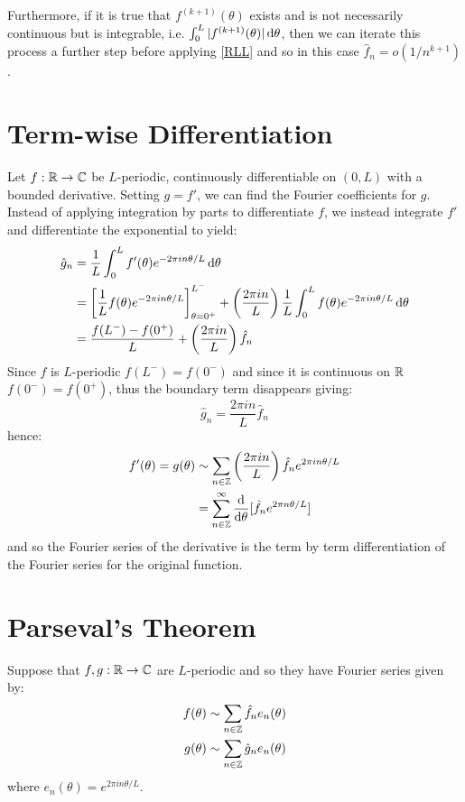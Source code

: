 \documentclass[../main.tex]{subfiles}
\begin{document}
Furthermore, if it is true that $f^{(k + 1)}(\theta)$ exists and is not necessarily continuous but is integrable, i.e. $\int_{0}^{L} |f^{(k + 1)}(\theta)| \d{\theta}$, then we can iterate this process a further step before applying \cref{RLL} and so in this case $\hat{f}_{n} = o(1/n^{k + 1})$.
\section{Term-wise Differentiation}
Let $f: \mathbb{R} \to \mathbb{C}$ be $L$-periodic, continuously differentiable on $(0, L)$ with a bounded derivative.
Setting $g = f'$, we can find the Fourier coefficients for $g$.
Instead of applying integration by parts to differentiate $f$, we instead integrate $f'$ and differentiate the exponential to yield:
\begin{align*}
  \hat{g}_n &= \frac{1}{L} \int_{0}^{L} f'(\theta) e^{-2\pi i n \theta / L} \d{\theta} \\
            &= \eval{\frac{1}{L} f(\theta) e^{-2 \pi i n \theta / L}}{\theta = 0^{+}}{L^{-}} + \left(\frac{2 \pi i n}{L}\right) \frac{1}{L} \int_{0}^{L} f(\theta) e^{-2 \pi i n \theta/L} \d{\theta} \\
            &= \frac{f(L^{-}) - f(0^{+})}{L} + \left(\frac{2 \pi i n}{L}\right) \hat{f}_n
\end{align*}
Since $f$ is $L$-periodic $f(L^{-}) = f(0^{-})$ and since it is continuous on $\mathbb{R}$ $f(0^{-}) = f(0^{+})$, thus the boundary term disappears giving:
\[
  \hat{g}_n = \frac{2 \pi i n}{L} \hat{f}_n
\]
hence:
\begin{align*}
  f'(\theta) = g(\theta) &\sim \sum_{n \in \Z} \left(\frac{2 \pi i n}{L}\right) \hat{f}_n e^{2 \pi i n \theta/L}  \\
                         &= \sum_{n \in \Z}^{\infty} \deriv{}{\theta}[\hat{f}_n e^{2 \pi n \theta /L}]
\end{align*}
and so the Fourier series of the derivative is the term by term differentiation of the Fourier series for the original function.
\section{Parseval's Theorem} \label{parsevalSec}
Suppose that $f, g: \mathbb{R} \to \mathbb{C}$ are $L$-periodic and so they have Fourier series given by:
\begin{align*}
  f(\theta) &\sim \sum_{n \in \mathbb{Z}} \hat{f}_n e_n(\theta) \\
  g(\theta) &\sim \sum_{n \in \mathbb{Z}} \hat{g}_n e_n(\theta)
\end{align*}
where $e_n(\theta) = e^{2 \pi i n \theta/L}$.
\end{document}
